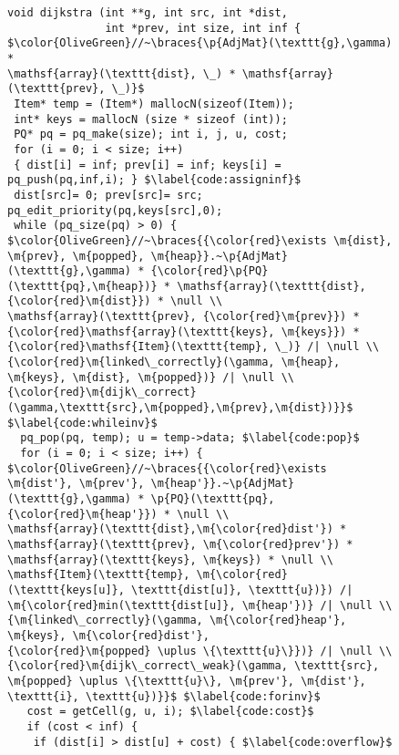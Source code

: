 
\begin{figure}[t]

\begin{lstlisting}[mathescape=true,showlines=true]
void dijkstra (int **g, int src, int *dist, 
               int *prev, int size, int inf {
$\color{OliveGreen}//~\braces{\p{AdjMat}(\texttt{g},\gamma) *
\mathsf{array}(\texttt{dist}, \_) * \mathsf{array}(\texttt{prev}, \_)}$
 Item* temp = (Item*) mallocN(sizeof(Item));
 int* keys = mallocN (size * sizeof (int));
 PQ* pq = pq_make(size); int i, j, u, cost;
 for (i = 0; i < size; i++) 
 { dist[i] = inf; prev[i] = inf; keys[i] = pq_push(pq,inf,i); } $\label{code:assigninf}$
 dist[src]= 0; prev[src]= src; pq_edit_priority(pq,keys[src],0);
 while (pq_size(pq) > 0) {
$\color{OliveGreen}//~\braces{{\color{red}\exists \m{dist}, \m{prev}, \m{popped}, \m{heap}}.~\p{AdjMat}(\texttt{g},\gamma) * {\color{red}\p{PQ}(\texttt{pq},\m{heap})} * \mathsf{array}(\texttt{dist},{\color{red}\m{dist}}) * \null \\
\mathsf{array}(\texttt{prev}, {\color{red}\m{prev}}) * 
{\color{red}\mathsf{array}(\texttt{keys}, \m{keys}}) * 
{\color{red}\mathsf{Item}(\texttt{temp}, \_)} /| \null \\
{\color{red}\m{linked\_correctly}(\gamma, \m{heap}, \m{keys}, \m{dist}, \m{popped})} /| \null \\
{\color{red}\m{dijk\_correct}(\gamma,\texttt{src},\m{popped},\m{prev},\m{dist})}}$ $\label{code:whileinv}$
  pq_pop(pq, temp); u = temp->data; $\label{code:pop}$
  for (i = 0; i < size; i++) {
$\color{OliveGreen}//~\braces{{\color{red}\exists \m{dist'}, \m{prev'}, \m{heap'}}.~\p{AdjMat}(\texttt{g},\gamma) * \p{PQ}(\texttt{pq},{\color{red}\m{heap'}}) * \null \\
\mathsf{array}(\texttt{dist},\m{\color{red}dist'}) * 
\mathsf{array}(\texttt{prev}, \m{\color{red}prev'}) * 
\mathsf{array}(\texttt{keys}, \m{keys}) * \null \\
\mathsf{Item}(\texttt{temp}, \m{\color{red}(\texttt{keys[u]}, \texttt{dist[u]}, \texttt{u})}) /| 
\m{\color{red}min(\texttt{dist[u]}, \m{heap'})} /| \null \\
{\m{linked\_correctly}(\gamma, \m{\color{red}heap'}, \m{keys}, \m{\color{red}dist'}, 
{\color{red}\m{popped} \uplus \{\texttt{u}\}})} /| \null \\
{\color{red}\m{dijk\_correct\_weak}(\gamma, \texttt{src}, \m{popped} \uplus \{\texttt{u}\}, \m{prev'}, \m{dist'}, \texttt{i}, \texttt{u})}}$ $\label{code:forinv}$
   cost = getCell(g, u, i); $\label{code:cost}$
   if (cost < inf) {
    if (dist[i] > dist[u] + cost) { $\label{code:overflow}$

\end{lstlisting}
\end{figure}
